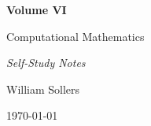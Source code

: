 \begin{titlepage}
\centering

\vspace*{5cm}

{\Huge\bfseries Volume VI\par}

\vspace{0.5cm}

{\LARGE Computational Mathematics\par}

\vspace{0.5cm}

{\large\itshape Self-Study Notes\par}

\vfill

{\large William Sollers\par}

\vspace{0.5cm}

{\large \today\par}

\end{titlepage}

